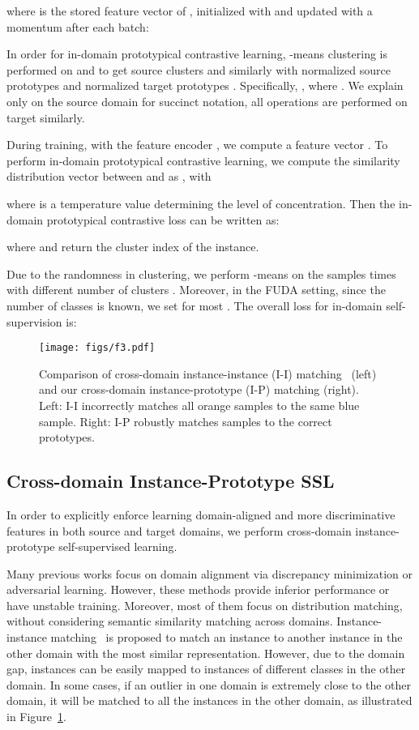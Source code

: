 \documentclass[final]{cvpr}
\begin{document}
where  is the stored feature vector of , initialized with  and updated with a momentum  after each batch:

In order for in-domain prototypical contrastive learning, -means clustering is performed on \bm{} and \bm{} to get source clusters  and similarly 
with normalized source prototypes  and normalized target prototypes . Specifically, , where . 
We explain only on the source domain for succinct notation, all operations are performed on target similarly.

During training, with the feature encoder , we compute a feature vector . To perform in-domain prototypical contrastive learning, we compute the similarity distribution vector between  and  as , with 


where  is a temperature value determining the level of concentration. Then the in-domain prototypical contrastive loss can be written as:

where  and  return the cluster index of the instance. 

Due to the randomness in clustering, we perform -means on the samples  times with different number of clusters . Moreover, in the FUDA setting, since the number of classes  is known, we set  for most .
The overall loss for in-domain self-supervision is:



\begin{figure}[t]
 \centering
 \texttt{[image: figs/f3.pdf]}
\caption{Comparison of cross-domain instance-instance (I-I) matching~\cite{kim2020cross} (left) and our cross-domain instance-prototype (I-P) matching (right). Left: I-I incorrectly matches all orange samples to the same blue sample. Right: I-P robustly matches samples to the correct prototypes. }
 \label{fig:id_vs_proto}
\end{figure}

\subsection{Cross-domain Instance-Prototype SSL}

In order to explicitly enforce learning domain-aligned and more discriminative features in both source and target domains, we perform cross-domain instance-prototype self-supervised learning. 

Many previous works focus on domain alignment via discrepancy minimization or adversarial learning. However, these methods provide inferior performance or have unstable training. Moreover, most of them focus on distribution matching, without considering semantic similarity matching across domains. Instance-instance matching~\cite{kim2020cross} is proposed to match an instance  to another instance  in the other domain with the most similar representation. However, due to the domain gap, instances can be easily mapped to instances of different classes in the other domain. In some cases, if an outlier in one domain is extremely close to the other domain, it will be matched to all the instances in the other domain, as illustrated in Figure~\ref{fig:id_vs_proto}. 
\end{document}
